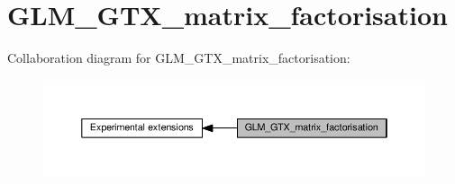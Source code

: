 \hypertarget{group__gtx__matrix__factorisation}{}\section{G\+L\+M\+\_\+\+G\+T\+X\+\_\+matrix\+\_\+factorisation}
\label{group__gtx__matrix__factorisation}
Collaboration diagram for G\+L\+M\+\_\+\+G\+T\+X\+\_\+matrix\+\_\+factorisation\+:
\nopagebreak
\begin{figure}[H]
\begin{center}
\leavevmode
\includegraphics[width=350pt]{df/d02/group__gtx__matrix__factorisation}
\end{center}
\end{figure}
